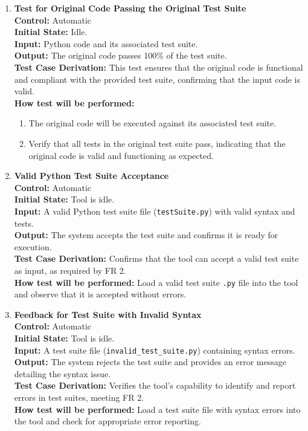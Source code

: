 \documentclass[12pt, titlepage]{article}
\begin{document}
\begin{enumerate}[label={\bf \textcolor{Maroon}{test-FR-IA-\arabic*}}, wide=0pt, font=\itshape]
  \item \textbf{Test for Original Code Passing the Original Test Suite}\\[2mm]
    \textbf{Control:} Automatic \\
    \textbf{Initial State:} Idle.\\
    \textbf{Input:} Python code and its associated test suite.\\
    \textbf{Output:} The original code passes 100\% of the test suite.\\[2mm]
    \textbf{Test Case Derivation:}  This test ensures that the original code is functional and compliant with the provided test suite, confirming that the input code is valid.\\[2mm]
    \textbf{How test will be performed:} 
    \begin{enumerate}
      \item The original code will be executed against its associated test suite.
      \item Verify that all tests in the original test suite pass, indicating that the original code is valid and functioning as expected.
    \end{enumerate}

  \item \textbf{Valid Python Test Suite Acceptance}\\[2mm]
    \textbf{Control:} Automatic \\
    \textbf{Initial State:} Tool is idle.\\
    \textbf{Input:} A valid Python test suite file (\texttt{testSuite.py}) with valid syntax and tests.\\
    \textbf{Output:} The system accepts the test suite and confirms it is ready for execution.\\[2mm]
    \textbf{Test Case Derivation:} Confirms that the tool can accept a valid test suite as input, as required by FR 2.\\[2mm]
    \textbf{How test will be performed:} Load a valid test suite \texttt{.py} file into the tool and observe that it is accepted without errors.

  \item \textbf{Feedback for Test Suite with Invalid Syntax}\\[2mm]
    \textbf{Control:} Automatic \\
    \textbf{Initial State:} Tool is idle.\\
    \textbf{Input:} A test suite file (\texttt{invalid\_test\_suite.py}) containing syntax errors.\\
    \textbf{Output:} The system rejects the test suite and provides an error message detailing the syntax issue.\\[2mm]
    \textbf{Test Case Derivation:} Verifies the tool's capability to identify and report errors in test suites, meeting FR 2.\\[2mm]
    \textbf{How test will be performed:} Load a test suite file with syntax errors into the tool and check for appropriate error reporting.


\end{enumerate}
\end{document}
